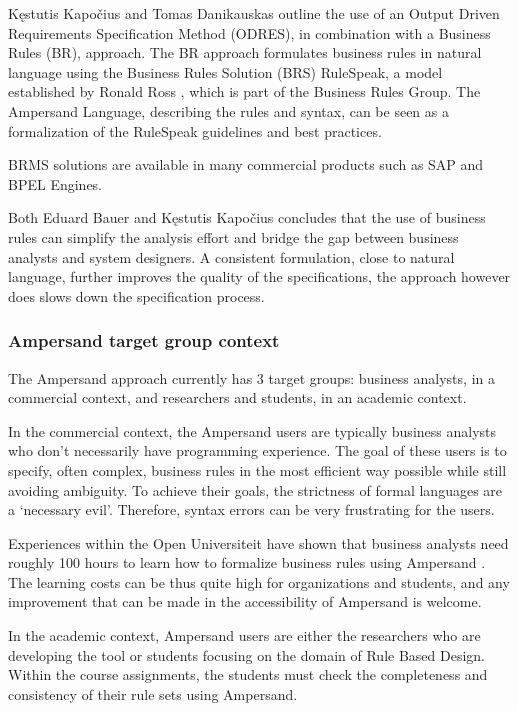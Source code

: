 %
%
%
Kęstutis Kapočius and Tomas Danikauskas  outline the use of an Output Driven Requirements Specification Method (ODRES), in combination with a Business Rules (BR), approach.
The BR approach formulates business rules in natural language using the Business Rules Solution (BRS) RuleSpeak, a model established by Ronald Ross , which is part of the Business Rules Group.
The Ampersand Language, describing the rules and syntax, can be seen as a formalization of the RuleSpeak guidelines and best practices.

%
BRMS solutions are available in many commercial products such as SAP and BPEL Engines.

Both Eduard Bauer  and Kęstutis Kapočius  concludes that the use of business rules can simplify the analysis effort and bridge the gap between business analysts and system designers. 
A consistent formulation, close to natural language, further improves the quality of the specifications, the approach however does slows down the specification process.

\subsubsection{Ampersand target group context}
The Ampersand approach currently has 3 target groups: business analysts, in a commercial context, and researchers and students, in an academic context.

In the commercial context, the Ampersand users are typically business analysts who don't necessarily have programming experience.
The goal of these users is to specify, often complex, business rules in the most efficient way possible while still avoiding ambiguity.
To achieve their goals, the strictness of formal languages are a `necessary evil'.
Therefore, syntax errors can be very frustrating for the users.

Experiences within the Open Universiteit have shown that business analysts need roughly 100 hours to learn how to formalize business rules using Ampersand .
The learning costs can be thus quite high for organizations and students, and any improvement that can be made in the accessibility of Ampersand is welcome.

In the academic context, Ampersand users are either the researchers who are developing the tool or students focusing on the domain of Rule Based Design. 
Within the course assignments, the students must check the completeness and consistency of their rule sets using Ampersand. 

